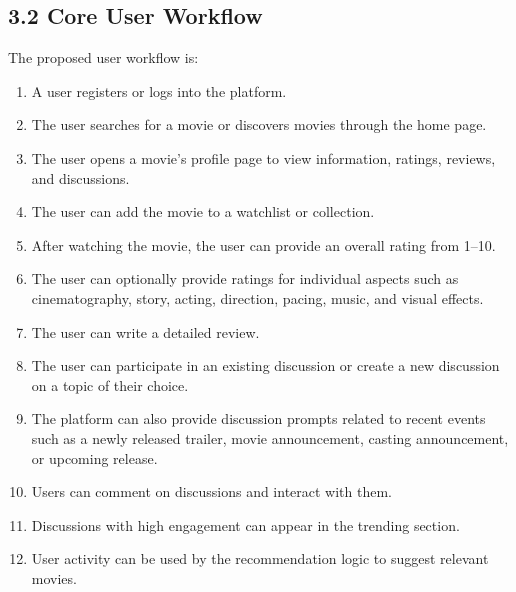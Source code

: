 \documentclass[11pt,a4paper]{article}
\begin{document}
\subsection{3.2 Core User Workflow}

The proposed user workflow is:

\begin{enumerate}

    \item A user registers or logs into the platform.

    \item The user searches for a movie or discovers movies through the home page.

    \item The user opens a movie's profile page to view information, ratings, reviews, and discussions.

    \item The user can add the movie to a watchlist or collection.

    \item After watching the movie, the user can provide an overall rating from 1--10.

    \item The user can optionally provide ratings for individual aspects such as cinematography, story, acting, direction, pacing, music, and visual effects.

    \item The user can write a detailed review.

    \item The user can participate in an existing discussion or create a new discussion on a topic of their choice.

    \item The platform can also provide discussion prompts related to recent events such as a newly released trailer, movie announcement, casting announcement, or upcoming release.

    \item Users can comment on discussions and interact with them.

    \item Discussions with high engagement can appear in the trending section.

    \item User activity can be used by the recommendation logic to suggest relevant movies.

\end{enumerate}
\end{document}

